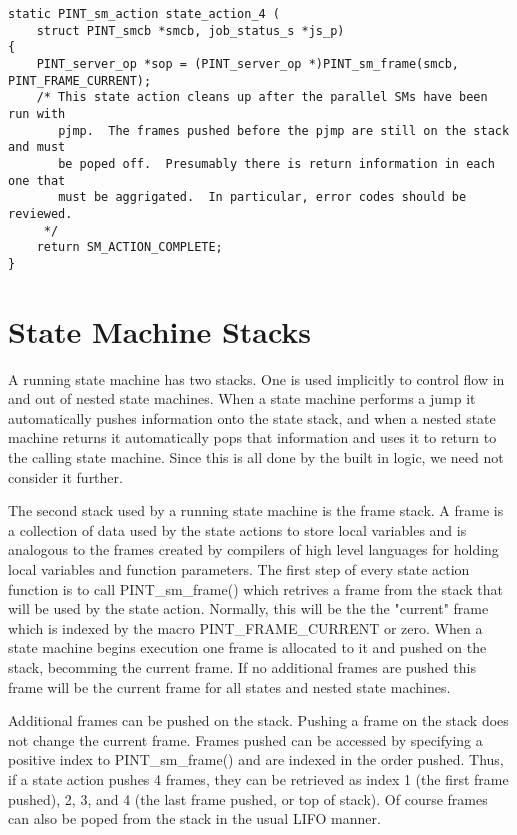 \begin{verbatim}
static PINT_sm_action state_action_4 (
    struct PINT_smcb *smcb, job_status_s *js_p)
{
    PINT_server_op *sop = (PINT_server_op *)PINT_sm_frame(smcb, PINT_FRAME_CURRENT);
    /* This state action cleans up after the parallel SMs have been run with
       pjmp.  The frames pushed before the pjmp are still on the stack and must
       be poped off.  Presumably there is return information in each one that
       must be aggrigated.  In particular, error codes should be reviewed.
     */
    return SM_ACTION_COMPLETE;
}

\end{verbatim}

\section{State Machine Stacks}

A running state machine has two stacks.  One is used implicitly to control flow 
in and out of nested state machines.  When a state machine performs a jump it
automatically pushes information onto the state stack, and when a nested
state machine returns it automatically pops that information and uses it to
return to the calling state machine.  Since this is all done by the built in
logic, we need not consider it further.

The second stack used by a running state machine is the frame stack.  A frame
is a collection of data used by the state actions to store local variables and
is analogous to the frames created by compilers of high level languages for
holding local variables and function parameters.  The first step of every
state action function is to call PINT\_sm\_frame() which retrives a frame from the
stack that will be used by the state action. Normally, this will be the 
the "current" frame which is indexed by the macro PINT\_FRAME\_CURRENT or zero.
When a state machine begins execution one frame is allocated to it and pushed
on the stack, becomming the current frame.  If no additional frames are pushed
this frame will be the current frame for all states and nested state machines.

Additional frames can be pushed on the stack.  Pushing a frame on the stack
does not change the current frame.  Frames pushed can be accessed by specifying
a positive index to PINT\_sm\_frame() and are indexed in the order pushed.  Thus,
if a state action pushes 4 frames, they can be retrieved  as index 1 (the first
frame pushed), 2, 3, and 4 (the last frame pushed, or top of stack).  Of course
frames can also be poped from the stack in the usual LIFO manner.

